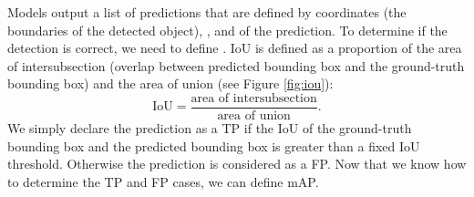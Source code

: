 Models output a list of predictions that are defined by 
coordinates (the boundaries of the detected object), , and
 of the prediction. To determine if the detection is
correct, we need to define . IoU is
defined as a proportion of the area of intersubsection (overlap between
predicted bounding box and the ground-truth bounding box) and the area of union
(see Figure \ref{fig:iou}):
$$
    \text{IoU} = \frac{\text{area of intersubsection}}{\text{area of union}}.
$$
We simply declare the prediction as a TP if the IoU of the ground-truth bounding
box and the predicted bounding box is greater than a fixed IoU threshold.
Otherwise the prediction is considered as a FP. Now that we know how to determine
the TP and FP cases, we can define mAP.

